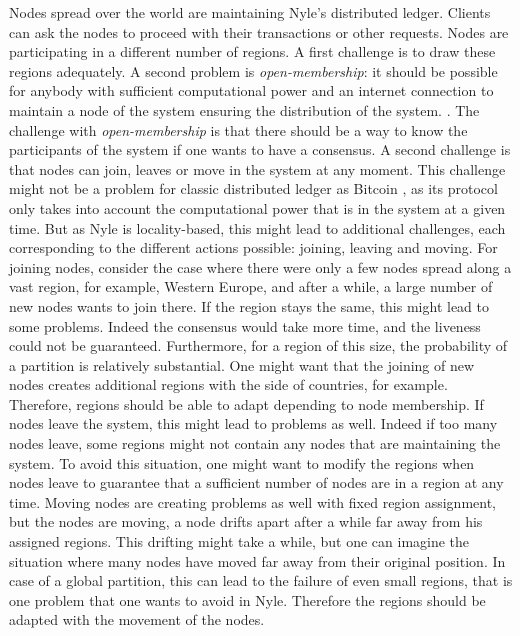 \documentclass[a4paper,11pt,oneside]{report}
\begin{document}
Nodes spread over the world are maintaining Nyle's distributed ledger. Clients can ask the nodes to proceed with their transactions or
other requests. Nodes are participating in a different number of regions. A
first challenge is to draw these regions adequately. A second problem is
\textit{open-membership}: it should be possible for anybody with sufficient
computational power and an internet connection to maintain a node of the system ensuring the distribution of the system.
. The challenge with
\textit{open-membership} is that there should be a way to know the participants
of the system if one wants to have a consensus. A second challenge is that
nodes can join, leaves or move in the system at any moment. This challenge might not be a
problem for classic distributed ledger as Bitcoin \cite{Nakamoto2009}, as its
protocol only takes into account the computational power that is in the system
at a given time. But as Nyle is locality-based, this might lead to additional
challenges, each corresponding to the different actions possible: joining,
leaving and moving. For joining nodes, consider the case where there were only
a few nodes spread along a vast region, for example, Western Europe, and after a
while, a large number of new nodes wants to join there. If the region stays the
same, this might lead to some problems. Indeed the consensus would take more
time, and the liveness could not be guaranteed.
Furthermore, for a region of
this size, the probability of a partition is relatively substantial. One might
want that the joining of new nodes creates additional regions with the side of countries, for example. Therefore, regions should be able to adapt
depending to node membership. If nodes leave the system, this might lead to
problems as well. Indeed if too many nodes leave, some regions might not contain any nodes that are maintaining the system. To
avoid this situation, one might want to modify the regions when nodes leave to
guarantee that a sufficient number of nodes are in a region at any time. Moving
nodes are creating problems as well with fixed region assignment, but the
nodes are moving, a node drifts apart after a while far away from his assigned regions. This drifting might take a while, but one can imagine the situation
where many nodes have moved far away from their original position. In case
of a global partition, this can lead to the failure of even small regions, that
is one problem that one wants to avoid in Nyle. Therefore the regions should be
adapted with the movement of the nodes. 
\end{document}
